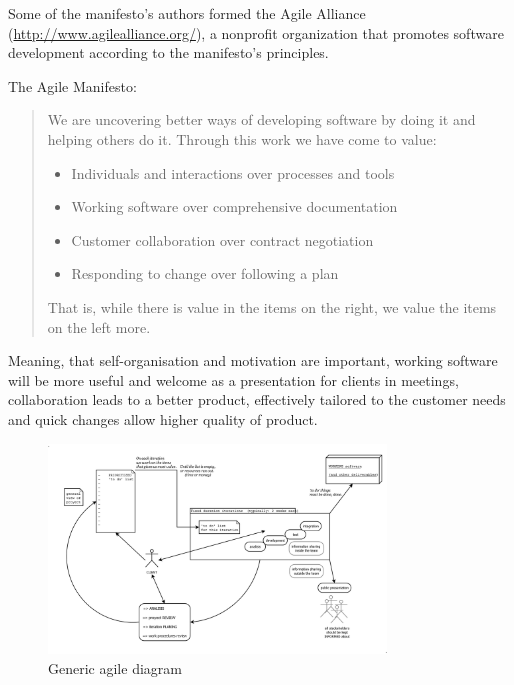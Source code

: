 Some of the manifesto's authors formed the Agile Alliance (\url{http://www.agilealliance.org/}), a nonprofit organization that promotes software development according to the manifesto's principles.

The Agile Manifesto:
\begin{quotation}
\begin{small}

We are uncovering better ways of developing software by doing it and helping others do it. Through this work we have come to value:

\begin{itemize}
\item Individuals and interactions over processes and tools
\item Working software over comprehensive documentation
\item Customer collaboration over contract negotiation
\item Responding to change over following a plan
\end{itemize}

That is, while there is value in the items on the right, we value the items on the left more.
\end{small}
\end{quotation}


Meaning, that self-organisation and motivation are important, working software will be more useful and welcome as a presentation for clients in meetings, collaboration leads to a better product, effectively tailored to the customer needs and quick changes allow higher quality of product.

\begin{figure}
	\centering
	\includegraphics[width=0.8\textwidth]{resources/generic-diagram-agile.png}
	\caption[Generic agile diagram]{Generic agile diagram}
\end{figure}

